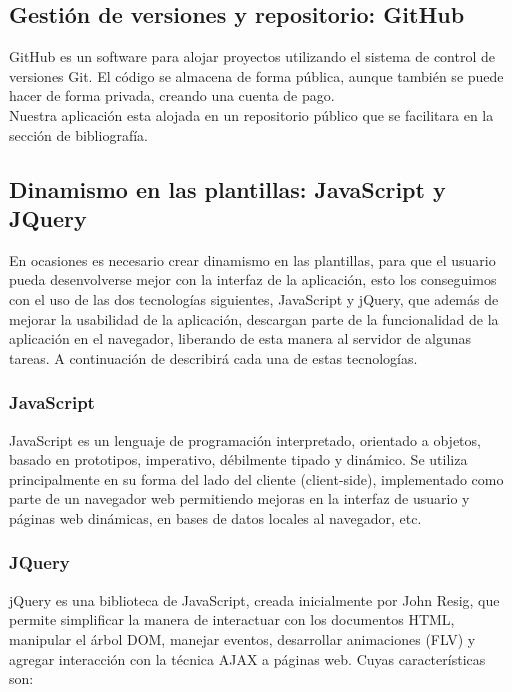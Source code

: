 \subsection{Gestión de versiones y repositorio: GitHub}

GitHub es un software para alojar proyectos utilizando el sistema de control de versiones Git. 
El código se almacena de forma pública, aunque también se puede hacer de forma privada, creando una cuenta de pago.\\

Nuestra aplicación esta alojada en un repositorio público que se facilitara en la sección de bibliografía.

\subsection{Dinamismo en las plantillas: JavaScript y JQuery}

En ocasiones es necesario crear dinamismo en las plantillas, para que el usuario pueda desenvolverse mejor con la interfaz de la aplicación, esto los conseguimos con el uso de las dos
tecnologías siguientes, JavaScript y jQuery, que además de mejorar la usabilidad de la aplicación, descargan parte de la funcionalidad de la aplicación en el navegador, 
liberando de esta manera al servidor de algunas tareas. A continuación de describirá cada una de estas tecnologías.\\

\subsubsection{JavaScript}
JavaScript es un lenguaje de programación interpretado, orientado a objetos, basado en prototipos, imperativo, débilmente tipado y dinámico. 
Se utiliza principalmente en su forma del lado del cliente (client-side), implementado como parte de un navegador web permitiendo mejoras en 
la interfaz de usuario y páginas web dinámicas, en bases de datos locales al navegador, etc.

\subsubsection{JQuery}
jQuery es una biblioteca de JavaScript, creada inicialmente por John Resig, que permite simplificar la manera de interactuar con los documentos HTML,
manipular el árbol DOM, manejar eventos, desarrollar animaciones (FLV) y agregar interacción con la técnica AJAX a páginas web. Cuyas características son:

